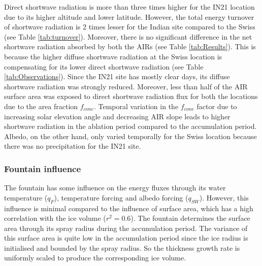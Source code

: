 \documentclass[utf8]{frontiersSCNS}
\begin{document}
Direct shortwave radiation is more than three times higher for the IN21 location due to its higher altitude and
lower latitude. However, the total energy turnover of shortwave radiation is 2 times lesser for the Indian site
compared to the Swiss (see Table \ref{tab:turnover}). Moreover, there is no significant difference in the net
shortwave radiation absorbed by both the AIRs (see Table \ref{tab:Results}). This is because the higher diffuse
shortwave radiation at the Swiss location is compensating for its lower direct shortwave radiation (see Table
\ref{tab:Observations}). Since the IN21 site has mostly clear days, its diffuse shortwave radiation was strongly
reduced. Moreover, less than half of the AIR surface area was exposed to direct shortwave radiation flux for
both the locations due to the area fraction $f_{cone}$. Temporal variation in the $f_{cone}$ factor due to
increasing solar elevation angle and decreasing AIR slope leads to higher shortwave radiation in the ablation
period compared to the accumulation period. Albedo, on the other hand, only varied temporally for the Swiss
location because there was no precipitation for the IN21 site.


\subsubsection{Fountain influence}

The fountain has some influence on the energy fluxes through its water temperature ($q_{F}$), temperature
forcing and albedo forcing ($q_{SW}$). However, this influence is minimal compared to the influence
of surface area, which has a high correlation with the ice volume ($r^2=0.6$). The fountain determines the
surface area through its spray radius during the accumulation period. The variance of this surface area is quite
low in the accumulation period since the ice radius is initialised and bounded by the spray radius. So the
thickness growth rate is uniformly scaled to produce the corresponding ice volume.

\end{document}
